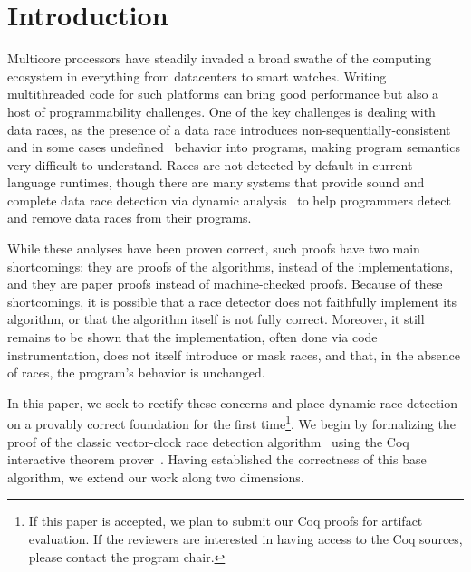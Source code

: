 \documentclass[preprint, 10pt]{sigplanconf}
\begin{document}


\section{Introduction}

Multicore processors have steadily invaded a broad swathe of the computing ecosystem in everything from datacenters to smart watches. Writing multithreaded code for such platforms can bring good performance but also a host of programmability challenges. One of the key challenges is dealing with data races, as the presence of a data race introduces non-sequentially-consistent~\cite{manson_java_2005} and in some cases undefined~\cite{boehm_foundations_2008} behavior into programs, making program semantics very difficult to understand. Races are not detected by default in current language runtimes, though there are many systems that provide sound and complete data race detection via dynamic analysis~\cite{djit+,fasttrack,slimstate} to help programmers detect and remove data races from their programs. 

While these analyses have been proven correct, such proofs have two main shortcomings: they are proofs of the algorithms, instead of the implementations, and they are paper proofs instead of machine-checked proofs. Because of these shortcomings, it is possible that a race detector does not faithfully implement its algorithm, or that the algorithm itself is not fully correct. Moreover, it still remains to be shown that the implementation, often done via code instrumentation, does not itself introduce or mask races, and that, in the absence of races, the program's behavior is unchanged.

In this paper, we seek to rectify these concerns and place dynamic race detection on a provably correct foundation for the first time\footnote{If this paper is accepted, we plan to submit our Coq proofs for artifact evaluation. If the reviewers are interested in having access to the Coq sources, please contact the program chair.}. We begin by formalizing the proof of the classic vector-clock race detection algorithm~\cite{vcfidge,vcmattern} using the Coq interactive theorem prover~\cite{coq}. Having established the correctness of this base algorithm, we extend our work along two dimensions. 
\end{document}
